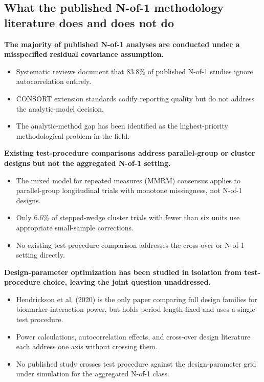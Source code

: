 \documentclass[
  11pt,
]{article}
\begin{document}
\subsection{What the published N-of-1 methodology literature does and does not do}\label{what-the-published-n-of-1-methodology-literature-does-and-does-not-do}

\textbf{The majority of published N-of-1 analyses are conducted under a misspecified residual covariance assumption.}

\begin{itemize}\setlength{\itemsep}{2pt}\setlength{\parskip}{0pt}
\item Systematic reviews document that 83.8\% of published N-of-1 studies ignore autocorrelation entirely.
\item CONSORT extension standards codify reporting quality but do not address the analytic-model decision.
\item The analytic-method gap has been identified as the highest-priority methodological problem in the field.
\end{itemize}

\textbf{Existing test-procedure comparisons address parallel-group or cluster designs but not the aggregated N-of-1 setting.}

\begin{itemize}\setlength{\itemsep}{2pt}\setlength{\parskip}{0pt}
\item The mixed model for repeated measures (MMRM) consensus applies to parallel-group longitudinal trials with monotone missingness, not N-of-1 designs.
\item Only 6.6\% of stepped-wedge cluster trials with fewer than six units use appropriate small-sample corrections.
\item No existing test-procedure comparison addresses the cross-over or N-of-1 setting directly.
\end{itemize}

\textbf{Design-parameter optimization has been studied in isolation from test-procedure choice, leaving the joint question unaddressed.}

\begin{itemize}\setlength{\itemsep}{2pt}\setlength{\parskip}{0pt}
\item Hendrickson et al. (2020) is the only paper comparing full design families for biomarker-interaction power, but holds period length fixed and uses a single test procedure.
\item Power calculations, autocorrelation effects, and cross-over design literature each address one axis without crossing them.
\item No published study crosses test procedure against the design-parameter grid under simulation for the aggregated N-of-1 class.
\end{itemize}
\end{document}
